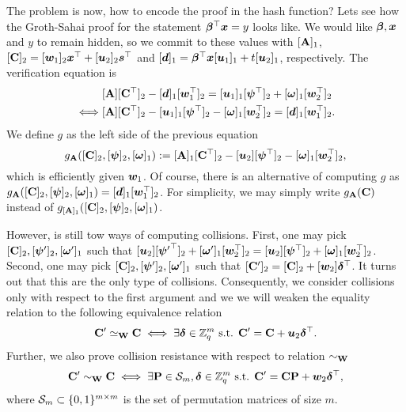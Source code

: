 The problem is now, how to encode the proof in the hash function? Lets see how the Groth-Sahai proof for the statement ${\boldsymbol{\beta}}^\top{\boldsymbol{x}} = y$ looks like. We would like ${\boldsymbol{\beta}},{\boldsymbol{x}}$ and $y$ to remain hidden, so we commit to these values with $[\mathbf{{A}}]_1$, $[\mathbf{{C}}]_2 = [{\boldsymbol{w}}_1]_2{\boldsymbol{x}}^\top+[{\boldsymbol{u}}_2]_2{\boldsymbol{s}}^\top$ and $[{\boldsymbol{d}}]_1 = {\boldsymbol{\beta}}^\top{\boldsymbol{x}}[{\boldsymbol{u}}_1]_1+t[{\boldsymbol{u}}_2]_1$, respectively. The verification equation is
\begin{align}
&[\mathbf{{A}}][\mathbf{{C}}^\top]_2-[{\boldsymbol{d}}]_1[{\boldsymbol{w}}_1^\top]_2 = [{\boldsymbol{u}}_1]_1[{\boldsymbol{\psi}}^\top]_2+[{\boldsymbol{\omega}}]_1[{\boldsymbol{w}}_2^\top]_2 \label{eq:ver-betax=y}\\
\iff & [\mathbf{{A}}][\mathbf{{C}}^\top]_2 - [{\boldsymbol{u}}_1]_1[{\boldsymbol{\psi}}^\top]_2 - [{\boldsymbol{\omega}}]_1[{\boldsymbol{w}}_2^\top]_2 = [{\boldsymbol{d}}]_1[{\boldsymbol{w}}_1^\top]_2. \nonumber
\end{align}
We define $g$ as the left side of the previous equation
$$
g_{\mathbf{{A}}}([\mathbf{{C}}]_2,[{\boldsymbol{\psi}}]_2,[{\boldsymbol{\omega}}]_1):= [\mathbf{{A}}]_1[\mathbf{{C}}^\top]_2-[{\boldsymbol{u}}_2][{\boldsymbol{\psi}}^\top]_2-[{\boldsymbol{\omega}}]_1[{\boldsymbol{w}}_2^\top]_2,
$$
which is efficiently given ${\boldsymbol{w}}_1$. Of course, there is an alternative of computing $g$ as $g_{\mathbf{{A}}}([\mathbf{{C}}]_2,[{\boldsymbol{\psi}}]_2,[{\boldsymbol{\omega}}]_1)=[{\boldsymbol{d}}]_1[{\boldsymbol{w}}_1^\top]_2$. For simplicity, we may simply write $g_{\mathbf{{A}}}(\mathbf{{C}})$ instead of $g_{[\mathbf{{A}}]_1}([\mathbf{{C}}]_2,[{\boldsymbol{\psi}}]_2,[{\boldsymbol{\omega}}]_1)$.

However, is still tow ways of computing collisions. First, one may pick $[\mathbf{{C}}]_2,\allowbreak[{\boldsymbol{\psi}}']_2,[{\boldsymbol{\omega}}']_1$ such that $[{\boldsymbol{u}}_2][{{\boldsymbol{\psi}}'}^\top]_2+[{\boldsymbol{\omega}}']_1[{\boldsymbol{w}}_2^\top]_2=[{\boldsymbol{u}}_2][{\boldsymbol{\psi}}^\top]_2+[{\boldsymbol{\omega}}]_1[{\boldsymbol{w}}_2^\top]_2$. Second, one may pick $[\mathbf{{C}}]_2,[{\boldsymbol{\psi}}']_2,[{\boldsymbol{\omega}}']_1$ such that $[\mathbf{{C}}']_2 = [\mathbf{{C}}]_2 + [{\boldsymbol{w}}_2]{\boldsymbol{\delta}}^\top$. It turns out that this are the only type of collisions. Consequently, we consider collisions only with respect to the first argument and we we will weaken the equality relation to the following equivalence relation
$$
\mathbf{{C}}'\simeq_{\mathbf{{W}}} \mathbf{{C}} \iff \exists {\boldsymbol{\delta}}\in\mathbb{Z}_q^m \text{ s.t. } \mathbf{{C}}' = \mathbf{{C}}+{\boldsymbol{u}}_2{\boldsymbol{\delta}}^\top.
$$
Further, we also prove collision resistance with respect to relation $\sim_{\mathbf{{W}}}$ 
$$
\mathbf{{C}}'\sim_{\mathbf{{W}}} \mathbf{{C}} \iff \exists \mathbf{{P}}\in\mathcal{S}_m, {\boldsymbol{\delta}}\in\mathbb{Z}_q^m \text{ s.t. } \mathbf{{C}}' = \mathbf{{C}}\mathbf{{P}}+{\boldsymbol{w}}_2{\boldsymbol{\delta}}^\top,
$$
where $\mathcal{S}_m\subset\{0,1\}^{m\times m}$ is the set of permutation matrices of size $m$.

